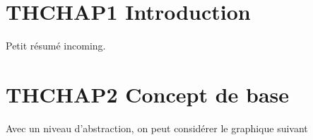 

    
    
    
    
    
    

\section{THCHAP1 Introduction}%
Petit résumé incoming.
\section{THCHAP2 Concept de base}%
    Avec un niveau d'abstraction, on peut considérer le graphique suivant 

